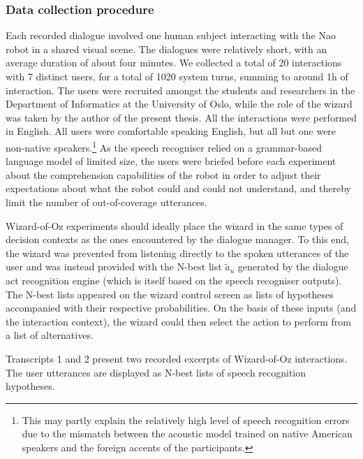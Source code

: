 \subsubsection*{Data collection procedure}

 Each recorded dialogue involved one human subject interacting with the Nao robot in a shared visual scene.  The dialogues were relatively short, with an average duration of about four minutes. We collected a total of 20 interactions with 7 distinct users, for a total of 1020 system turns, summing to around 1h of interaction.  The users were recruited amongst the students and researchers in the Department of Informatics at the University of Oslo, while the role of the wizard was taken by the author of the present thesis.  All the interactions were performed in English. All users were comfortable speaking English, but all but one were non-native speakers.\footnote{This may partly explain the relatively high level of speech recognition errors due to the mismatch between the acoustic model trained on native American speakers and the foreign accents of the participants.}  As the speech recogniser relied on a grammar-based language model of limited size, the users were briefed before each experiment about the comprehension capabilities of the robot in order to adjust their expectations about what the robot could and could not understand, and thereby limit the number of out-of-coverage utterances.

Wizard-of-Oz experiments should ideally place the wizard in the same types of decision contexts as the ones encountered by the dialogue manager. To this end, the wizard was prevented from listening directly to the spoken utterances of the user and was instead provided with the N-best list $\tilde{a}_u$ generated by the dialogue act recognition engine (which is itself based on the speech recogniser outputs).  The N-best lists appeared on the wizard control screen as lists of hypotheses accompanied with their respective probabilities. On the basis of these inputs (and the interaction context), the wizard could then select the action to perform from a list of alternatives.  

Transcripts 1 and 2 present two recorded excerpts of Wizard-of-Oz interactions.  The user utterances are displayed as N-best lists of speech recognition hypotheses. 

